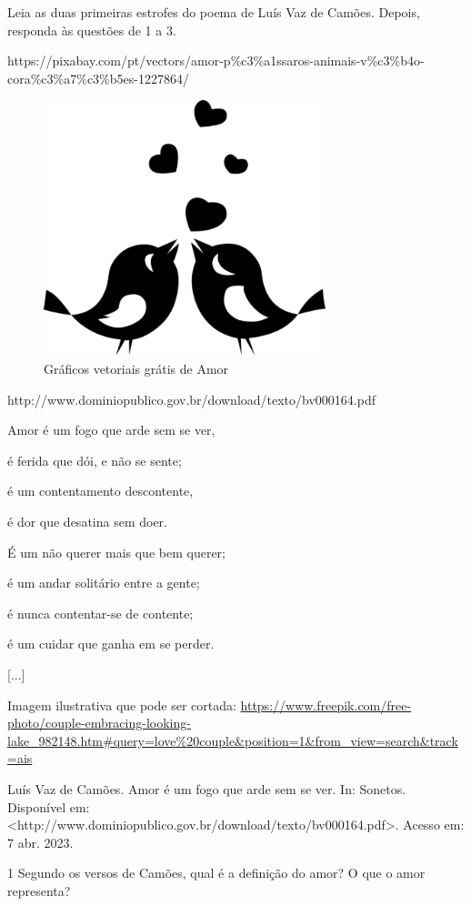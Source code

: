 \begin{itemize}
\begin{itemize}
{\begin{itemize}
\begin{itemize}

Leia as duas primeiras estrofes do poema de Luís Vaz de Camões. Depois,
responda às questões de 1 a 3.

https://pixabay.com/pt/vectors/amor-p\%c3\%a1ssaros-animais-v\%c3\%b4o-cora\%c3\%a7\%c3\%b5es-1227864/

\begin{figure}
\centering
\includegraphics[width=3.22917in,height=2.92805in]{./_SAEB_9_POR/media/image24.png}
\caption{Gráficos vetoriais grátis de Amor}
\end{figure}

http://www.dominiopublico.gov.br/download/texto/bv000164.pdf

Amor é um fogo que arde sem se ver,

é ferida que dói, e não se sente;

é um contentamento descontente,

é dor que desatina sem doer.

É um não querer mais que bem querer;

é um andar solitário entre a gente;

é nunca contentar-se de contente;

é um cuidar que ganha em se perder.

{[}...{]}

Imagem ilustrativa que pode ser cortada:
\url{https://www.freepik.com/free-photo/couple-embracing-looking-lake_982148.htm\#query=love\%20couple\&position=1\&from_view=search\&track=ais}

Luís Vaz de Camões. Amor é um fogo que arde sem se ver. In: Sonetos.
Disponível em:
\textless{}http://www.dominiopublico.gov.br/download/texto/bv000164.pdf\textgreater{}.
Acesso em: 7 abr. 2023.

\num{1} Segundo os versos de Camões, qual é a definição do amor? O que o
amor representa? 


\end{itemize}
\end{itemize}}
\end{itemize}
\end{itemize}
